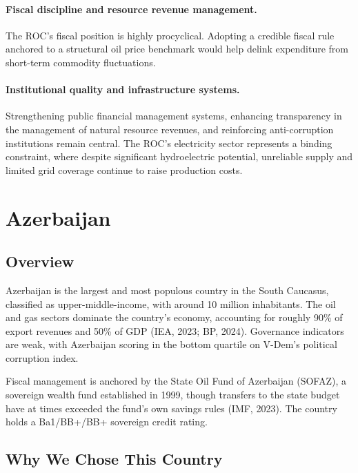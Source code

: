 \documentclass[12pt,a4paper]{report}
\begin{document}
\paragraph{Fiscal discipline and resource revenue management.} The ROC's fiscal position is highly procyclical. Adopting a credible fiscal rule anchored to a structural oil price benchmark would help delink expenditure from short-term commodity fluctuations.

\paragraph{Institutional quality and infrastructure systems.} Strengthening public financial management systems, enhancing transparency in the management of natural resource revenues, and reinforcing anti-corruption institutions remain central. The ROC's electricity sector represents a binding constraint, where despite significant hydroelectric potential, unreliable supply and limited grid coverage continue to raise production costs.


\section{Azerbaijan}

\subsection{Overview}

Azerbaijan is the largest and most populous country in the South Caucasus, classified as upper-middle-income, with around 10 million inhabitants. The oil and gas sectors dominate the country's economy, accounting for roughly 90\% of export revenues and 50\% of GDP (IEA, 2023; BP, 2024). Governance indicators are weak, with Azerbaijan scoring in the bottom quartile on V-Dem's political corruption index.

Fiscal management is anchored by the State Oil Fund of Azerbaijan (SOFAZ), a sovereign wealth fund established in 1999, though transfers to the state budget have at times exceeded the fund's own savings rules (IMF, 2023). The country holds a Ba1/BB+/BB+ sovereign credit rating.

\subsection{Why We Chose This Country}
\end{document}
